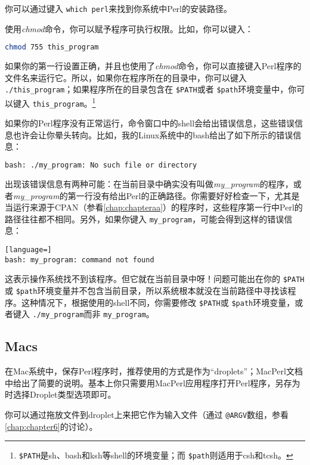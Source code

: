 你可以通过键入 \verb|which perl|来找到你系统中Perl的安装路径。

使用\textit{chmod}命令，你可以赋予程序可执行权限。比如，你可以键入：

\begin{lstlisting}[language=bash]
chmod 755 this_program
\end{lstlisting}

如果你的第一行设置正确，并且也使用了\textit{chmod}命令，你可以直接键入Perl程序的文件名来运行它。所以，如果你在程序所在的目录中，你可以键入 \verb|./this_program|；如果程序所在的目录包含在 \verb|$PATH|或者 \verb|$path|环境变量中，你可以键入 \verb|this_program|。\footnote{ \verb|$PATH|是sh、bash和ksh等shell的环境变量；而 \verb|$path|则适用于csh和tcsh。}

如果你的Perl程序没有正常运行，命令窗口中的shell会给出错误信息，这些错误信息也许会让你晕头转向。比如，我的Linux系统中的bash给出了如下所示的错误信息：

\begin{lstlisting}[language=bash]
bash: ./my_program: No such file or directory
\end{lstlisting}

出现该错误信息有两种可能：在当前目录中确实没有叫做\textit{my\_program}的程序，或者\textit{my\_program}的第一行没有给出Perl的正确路径。你需要好好检查一下，尤其是当运行来源于CPAN（参看\autoref{chap:chapteraa}）的程序时，这些程序第一行中Perl的路径往往都不相同。另外，如果你键入 \verb|my_program|，可能会得到这样的错误信息：

\begin{lstlisting}[language=]
bash: my_program: command not found
\end{lstlisting}

这表示操作系统找不到该程序。但它就在当前目录中呀！问题可能出在你的 \verb|$PATH|或 \verb|$path|环境变量并不包含当前目录，所以系统根本就没在当前路径中寻找该程序。这种情况下，根据使用的shell不同，你需要修改 \verb|$PATH|或 \verb|$path|环境变量，或者键入 \verb|./my_program|而非 \verb|my_program|。

\subsection{Macs}
在Mac系统中，保存Perl程序时，推荐使用的方式是作为“droplets”；MacPerl文档中给出了简要的说明。基本上你只需要用MacPerl应用程序打开Perl程序，另存为时选择Droplet类型选项即可。

你可以通过拖放文件到droplet上来把它作为输入文件（通过 \verb|@ARGV|数组，参看\autoref{chap:chapter6}的讨论）。

